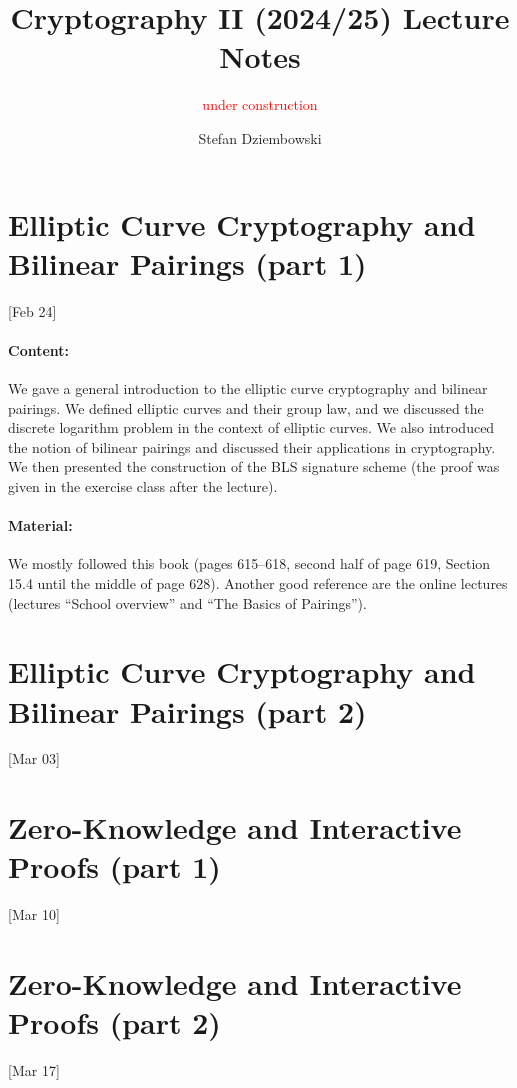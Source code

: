 \documentclass{llncs}
\title{Cryptography II (2024/25) Lecture Notes}
\subtitle{\textcolor{red}{under construction}}
\author{Stefan Dziembowski}
\institute{University of Warsaw}
\begin{document}
\maketitle

\section{Elliptic Curve Cryptography and Bilinear Pairings (part 1)}

[Feb 24]

\paragraph{Content:} We gave a general introduction to the elliptic curve cryptography and bilinear pairings. We defined elliptic curves and their group law, and we discussed the discrete logarithm problem in the context of elliptic curves. We also introduced the notion of bilinear pairings and discussed their applications in cryptography. We then presented the construction of the BLS signature scheme \cite{Boneh2001} (the proof was given in the exercise class after the lecture). 

\paragraph{Material:} We mostly followed this book \cite{Boneh2023} (pages 615--618, second half of page 619, Section 15.4 until the middle of page 628). Another good reference are the online lectures \cite{WinterSchool} (lectures ``School overview'' and ``The Basics of Pairings'').



\section{Elliptic Curve Cryptography and Bilinear Pairings (part 2)}

[Mar 03]

\section{Zero-Knowledge and Interactive Proofs (part 1)}
[Mar 10]

\section{Zero-Knowledge and Interactive Proofs (part 2)}
[Mar 17]
\end{document}
